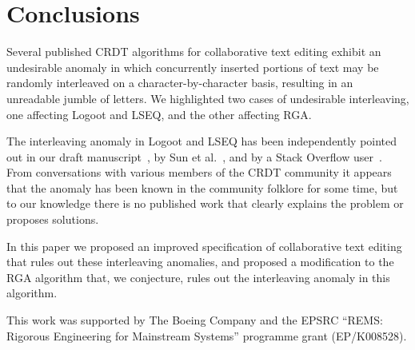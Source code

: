 \documentclass[sigconf]{acmart}
\begin{document}
\section{Conclusions}

Several published CRDT algorithms for collaborative text editing exhibit an undesirable anomaly in which concurrently inserted portions of text may be randomly interleaved on a character-by-character basis, resulting in an unreadable jumble of letters.
We highlighted two cases of undesirable interleaving, one affecting Logoot and LSEQ, and the other affecting RGA.

The interleaving anomaly in Logoot and LSEQ has been independently pointed out in our draft manuscript~\cite{ExtendedVersion}, by Sun et al.~\cite{Sun:2018wb}, and by a Stack Overflow user~\cite{StackOverflowInterleaving}.
From conversations with various members of the CRDT community it appears that the anomaly has been known in the community folklore for some time, but to our knowledge there is no published work that clearly explains the problem or proposes solutions.

In this paper we proposed an improved specification of collaborative text editing that rules out these interleaving anomalies, and proposed a modification to the RGA algorithm that, we conjecture, rules out the interleaving anomaly in this algorithm.

\begin{acks}
This work was supported by The Boeing Company and the EPSRC ``REMS: Rigorous Engineering for Mainstream Systems'' programme grant (EP/K008528).
\end{acks}



\end{document}
